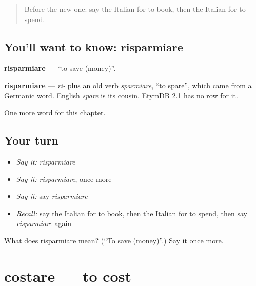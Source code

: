 \label{lesson:IT-C204-risparmiare}



\begin{quote}
Before the new one: say the Italian for to book, then the Italian for to spend.
\end{quote}

\subsection*{You'll want to know: risparmiare}
\textbf{risparmiare} — \textquotedblleft{}to save (money)\textquotedblright{}.

\begin{cousinweb}
\textbf{risparmiare} — \emph{ri-} plus an old verb \emph{sparmiare}, \textquotedblleft{}to spare\textquotedblright{}, which came from a Germanic word. English \emph{spare} is its cousin. EtymDB 2.1 has no row for it.
\end{cousinweb}

\begin{grammarlens}[title={What you've built}]
One more word for this chapter.
\end{grammarlens}

\subsection*{Your turn}
\begin{itemize}
\raggedright
  \item \emph{Say it:} \emph{risparmiare}
  \item \emph{Say it:} \emph{risparmiare}, once more
  \item \emph{Say it:} say \emph{risparmiare}
  \item \emph{Recall:} say the Italian for to book, then the Italian for to spend, then say \emph{risparmiare} again
\end{itemize}

\begin{tcolorbox}[breakable,colback=teal!4,colframe=teal!35!black,title={Before you move on}]
What does risparmiare mean? (\textquotedblleft{}To save (money)\textquotedblright{}.) Say it once more.
\end{tcolorbox}
\section[costare]{costare — to cost}

\label{lesson:IT-C204-costare}



